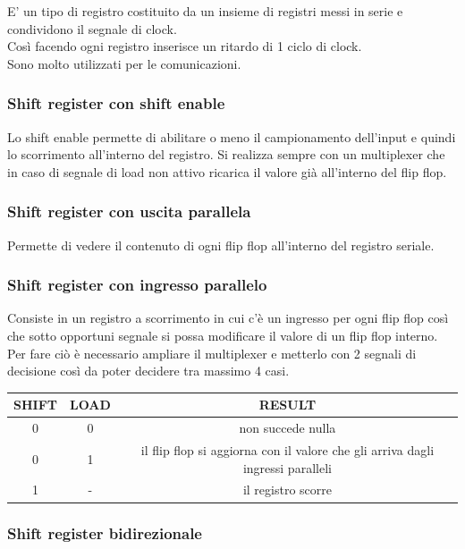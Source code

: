 \documentclass[a4paper]{book}
\begin{document}
E' un tipo di registro costituito da un insieme di registri messi in serie e condividono il segnale di clock.
\\
Così facendo ogni registro inserisce un ritardo di 1 ciclo di clock.\\
Sono molto utilizzati per le comunicazioni.

\subsubsection*{Shift register con shift enable}

Lo shift enable permette di abilitare o meno il campionamento dell'input e quindi lo scorrimento all'interno del registro.
Si realizza sempre con un multiplexer che in caso di segnale di load non attivo ricarica il valore già all'interno del flip flop.

\subsubsection*{Shift register con uscita parallela}

Permette di vedere il contenuto di ogni flip flop all'interno del registro seriale.

\subsubsection*{Shift register con ingresso parallelo}

Consiste in un registro a scorrimento in cui c'è un ingresso per ogni flip flop così che sotto opportuni segnale si possa modificare il valore di un flip flop interno.\\
Per fare ciò è necessario ampliare il multiplexer e metterlo con 2 segnali di decisione così da poter decidere tra massimo 4 casi.\\
\begin{tabular}{|c|c|c|}
\hline
SHIFT & LOAD & RESULT \\
\hline
0 & 0 & non succede nulla \\
\hline
0 & 1 & il flip flop si aggiorna con il valore che gli arriva dagli ingressi paralleli \\
\hline
1 & - & il registro scorre \\
\hline
\end{tabular}

\subsubsection*{Shift register bidirezionale}
\end{document}
